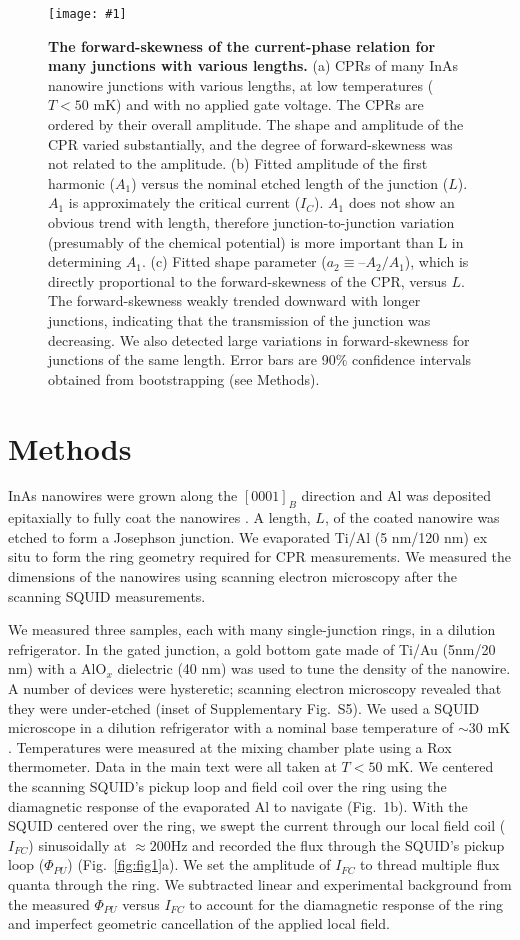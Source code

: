 \documentclass[11pt]{article}
\newcommand{\fig}[5]{
	\begin{figure}
	\centerline{\texttt{[image: \#1]}}
\caption[#3]{\label{#2} \textbf{#3} #4}
\end{figure}}
\begin{document}
\fig{./fig5.pdf}{fig:fig5}
{The forward-skewness of the current-phase relation for many junctions with various lengths.}
{(a) CPRs of many InAs nanowire junctions with various lengths, at low temperatures ($T < 50$ mK) and with no applied gate voltage. The CPRs are ordered by their overall amplitude. The shape and amplitude of the CPR varied substantially, and the degree of forward-skewness was not related to the amplitude. (b) Fitted amplitude of the first harmonic ($A_1$) versus the nominal etched length of the junction ($L$). $A_1$ is approximately the critical current ($I_C$). $A_1$ does not show an obvious trend with length, therefore junction-to-junction variation (presumably of the chemical potential) is more important than L in determining $A_1$. (c) Fitted shape parameter ($a_2 \equiv –A_2/A_1$), which is directly proportional to the forward-skewness of the CPR, versus $L$. The forward-skewness weakly trended downward with longer junctions, indicating that the transmission of the junction was decreasing. We also detected large variations in forward-skewness for junctions of the same length. Error bars are 90$\%$ confidence intervals obtained from bootstrapping (see Methods).}{0.9}


\FloatBarrier

\section{Methods}
InAs nanowires were grown along the $[0001]_B$ direction and Al was deposited epitaxially to fully coat the nanowires . A length, $L$, of the coated nanowire was etched to form a Josephson junction. We evaporated Ti/Al (5 nm/120 nm) ex situ to form the ring geometry required for CPR measurements. We measured the dimensions of the nanowires using scanning electron microscopy after the scanning SQUID measurements.

We measured three samples, each with many single-junction rings, in a dilution refrigerator. In the gated junction, a gold bottom gate made of Ti/Au (5nm/20 nm) with a AlO$_x$ dielectric (40 nm) was used to tune the density of the nanowire. A number of devices were hysteretic; scanning electron microscopy revealed that they were under-etched (inset of Supplementary Fig.~S5).
We used a SQUID microscope in a dilution refrigerator with a nominal base temperature of $\sim 30$ mK . Temperatures were measured at the mixing chamber plate using a Rox thermometer. Data in the main text were all taken at $T<50$ mK.
We centered the scanning SQUID's pickup loop and field coil over the ring using the diamagnetic response of the evaporated Al to navigate (Fig.~1b). With the SQUID centered over the ring, we swept the current through our local field coil ($I_{FC}$) sinusoidally at $\approx 200 $Hz and recorded the flux through the SQUID’s pickup loop ($\Phi_{PU}$) (Fig.~\ref{fig:fig1}a). We set the amplitude of $I_{FC}$ to thread multiple flux quanta through the ring. We subtracted linear and experimental background from the measured $\Phi_{PU}$ versus $I_{FC}$ to account for the diamagnetic response of the ring and imperfect geometric cancellation of the applied local field.
\end{document}
